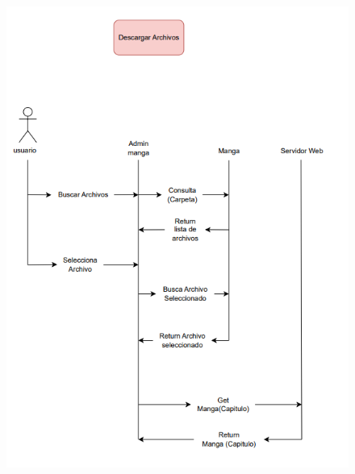 \documentclass[12pt]{article}
\begin{document}
\begin{figure}[htbp]
	\centering
		\includegraphics[width=1.00\textwidth]{Screenshot 2023-10-05 114448.png}
	\label{fig:Screenshot 2023-10-05 114448}
\end{figure}
\end{document}
